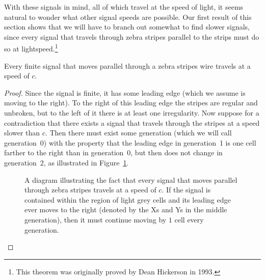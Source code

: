 With these signals in mind, all of which travel at the speed of light, it seems natural to wonder what other signal speeds are possible. Our first result of this section shows that we will have to branch out somewhat to find slower signals, since every signal that travels through zebra stripes parallel to the strips must do so at lightspeed.\footnote{This theorem was originally proved by Dean Hickerson in 1993.}

\begin{theorem}\label{thm:speed_limit_zebra_fast}
	Every finite signal that moves parallel through a zebra stripes wire travels at a speed of $c$.
\end{theorem}

\begin{proof}
	Since the signal is finite, it has some leading edge (which we assume is moving to the right). To the right of this leading edge the stripes are regular and unbroken, but to the left of it there is at least one irregularity. Now suppose for a contradiction that there exists a signal that travels through the stripes at a speed slower than $c$. Then there must exist some generation (which we will call generation~0) with the property that the leading edge in generation~1 is one cell farther to the right than in generation~0, but then does not change in generation~2, as illustrated in Figure~\ref{fig:speed_limit_zebra_fast}.
	
	\begin{figure}[!htb]
		\centering
		    
		\caption{A diagram illustrating the fact that every signal that moves parallel through zebra stripes travels at a speed of $c$. If the signal is contained within the region of light grey cells and its leading edge ever moves to the right (denoted by the Xs and Ys in the middle generation), then it must continue moving by $1$ cell every generation.}\label{fig:speed_limit_zebra_fast}
	\end{figure}
	

\end{proof}
